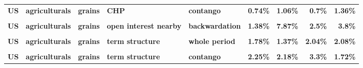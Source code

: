 \documentclass[
  authoryear,
  preprint,
  3p]{elsarticle}
\begin{document}
\begin{landscape}
\begin{longtable}[t]{>{}l>{}l>{}l>{}l>{}l>{}r>{}r>{}r>{}r}
\textbf{US} & \textbf{agriculturals} & \textbf{grains} & \textbf{CHP} & \textbf{contango} & \textcolor[HTML]{4285f4}{\textbf{0.74\%}} & \textcolor[HTML]{4285f4}{\textbf{1.06\%}} & \textcolor[HTML]{4285f4}{\textbf{0.7\%}} & \textcolor[HTML]{4285f4}{\textbf{1.36\%}}\\
\textbf{\cellcolor{gray!10}{US}} & \textbf{\cellcolor{gray!10}{agriculturals}} & \textbf{\cellcolor{gray!10}{grains}} & \textbf{\cellcolor{gray!10}{open interest nearby}} & \textbf{\cellcolor{gray!10}{whole period}} & \textcolor[HTML]{4285f4}{\textbf{\cellcolor{gray!10}{2.22\%}}} & \textcolor[HTML]{4285f4}{\textbf{\cellcolor{gray!10}{4.18\%}}} & \textcolor[HTML]{4285f4}{\textbf{\cellcolor{gray!10}{0.67\%}}} & \textcolor[HTML]{4285f4}{\textbf{\cellcolor{gray!10}{2.04\%}}}\\
\textbf{US} & \textbf{agriculturals} & \textbf{grains} & \textbf{open interest nearby} & \textbf{backwardation} & \textcolor[HTML]{4285f4}{\textbf{1.38\%}} & \textcolor[HTML]{4285f4}{\textbf{7.87\%}} & \textcolor[HTML]{4285f4}{\textbf{2.5\%}} & \textcolor[HTML]{4285f4}{\textbf{3.8\%}}\\
\textbf{\cellcolor{gray!10}{US}} & \textbf{\cellcolor{gray!10}{agriculturals}} & \textbf{\cellcolor{gray!10}{grains}} & \textbf{\cellcolor{gray!10}{open interest nearby}} & \textbf{\cellcolor{gray!10}{contango}} & \textcolor[HTML]{4285f4}{\textbf{\cellcolor{gray!10}{3.3\%}}} & \textcolor[HTML]{4285f4}{\textbf{\cellcolor{gray!10}{1.92\%}}} & \textcolor[HTML]{4285f4}{\textbf{\cellcolor{gray!10}{0.69\%}}} & \textcolor[HTML]{4285f4}{\textbf{\cellcolor{gray!10}{1.24\%}}}\\
\addlinespace
\textbf{US} & \textbf{agriculturals} & \textbf{grains} & \textbf{term structure} & \textbf{whole period} & \textcolor[HTML]{4285f4}{\textbf{1.78\%}} & \textcolor[HTML]{4285f4}{\textbf{1.37\%}} & \textcolor[HTML]{4285f4}{\textbf{2.04\%}} & \textcolor[HTML]{4285f4}{\textbf{2.08\%}}\\
\textbf{\cellcolor{gray!10}{US}} & \textbf{\cellcolor{gray!10}{agriculturals}} & \textbf{\cellcolor{gray!10}{grains}} & \textbf{\cellcolor{gray!10}{term structure}} & \textbf{\cellcolor{gray!10}{backwardation}} & \textcolor[HTML]{4285f4}{\textbf{\cellcolor{gray!10}{1.47\%}}} & \textcolor[HTML]{4285f4}{\textbf{\cellcolor{gray!10}{1.19\%}}} & \textcolor[HTML]{4285f4}{\textbf{\cellcolor{gray!10}{1.87\%}}} & \textcolor[HTML]{4285f4}{\textbf{\cellcolor{gray!10}{3.56\%}}}\\
\textbf{US} & \textbf{agriculturals} & \textbf{grains} & \textbf{term structure} & \textbf{contango} & \textcolor[HTML]{4285f4}{\textbf{2.25\%}} & \textcolor[HTML]{4285f4}{\textbf{2.18\%}} & \textcolor[HTML]{4285f4}{\textbf{3.3\%}} & \textcolor[HTML]{4285f4}{\textbf{1.72\%}}\\

\end{longtable}
\end{landscape}
\end{document}
